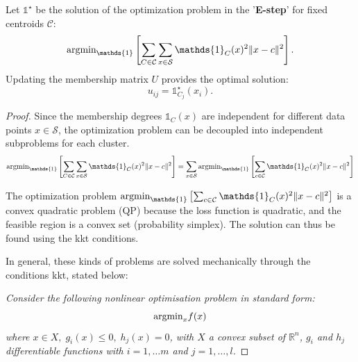 \begin{theorem} \label{thm:Eupdate}
	Let \(\mathds{1}^\star\) be the solution of the optimization problem in the '\textbf{E-step}' for fixed centroids \(\mathcal{C}\):
	\[
	\textnormal{argmin}_{\mathds{1}}\left[\sum_{C\in\mathcal{C}}\sum_{x \in \mathcal{S}}\mathds{1}_C(x)^2\|x-c\|^2\right].
	\]
	Updating the membership matrix \(U\) provides the optimal solution:
	\[
	u_{ij} = \mathds{1}^\star_{C_j}(x_i).
	\]
\begin{proof}
	Since the membership degrees $\mathds{1}_C(x)$ are independent for different data points $x\in \mathcal{S}$, the optimization problem can be decoupled into independent subproblems for each cluster.
	$$\textnormal{argmin}_{ \mathds{1}}\left[\sum_{C\in\mathcal{C}}\sum_{x \in \mathcal{S}}\mathds{1}_C(x)^2\|x-c\|^2\right] = \sum_{x\in\mathcal{S}}\textnormal{argmin}_{ \mathds{1}}\left[\sum_{c \in \mathcal{C}}\mathds{1}_C(x)^2\|x-c\|^2\right]$$

	\noindent The optimization problem $\textnormal{argmin}_{\mathds{1}}\left[\sum_{c \in \mathcal{C}}\mathds{1}_C(x)^2\|x-c\|^2\right]$ is a convex quadratic problem (QP) because the loss function is quadratic, and the feasible region is a convex set (probability simplex). The solution can thus be found using the \gls{kkt} conditions.

	\bigskip \noindent In general, these kinds of problems are solved mechanically through the conditions \gls{kkt}, stated below:

	\itshape\noindent Consider the following nonlinear optimisation problem in standard form:
	$$\textnormal{argmin}_x f(x)$$
	where $x\in X,\; g_i(x)\leq0,\; h_j(x)=0$, with $X$ a convex subset of $\mathbb{R}^n$, $g_i$ and $h_j$ differentiable functions with $i=1,\ldots m$ and $j=1,\ldots,l$.


\end{proof}
\end{theorem}
